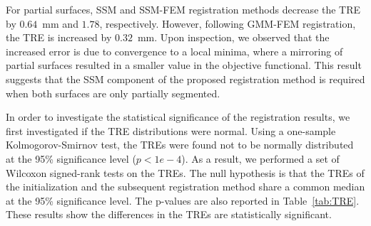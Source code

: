 \documentclass[journal]{IEEEtran}
\begin{document}
For partial surfaces, SSM and SSM-FEM registration methods decrease the TRE by $0.64$~mm and $1.78$, respectively. However, following GMM-FEM registration, the TRE is increased by $0.32$~mm. Upon inspection, we observed that the increased error is due to convergence to a local minima, where a mirroring of partial surfaces resulted in a smaller value in the objective functional. This result suggests that the SSM component of the proposed registration method is required when both surfaces are only partially segmented.

In order to investigate the statistical significance of the registration results, we first investigated if the TRE distributions were normal. Using a one-sample Kolmogorov-Smirnov test, the TREs were found not to be normally distributed at the 95\% significance level ($p<1e-4$). As a result, we performed a set of Wilcoxon signed-rank tests on the TREs. The null hypothesis is that the TREs of the initialization and the subsequent registration method share a common median at the 95\% significance level. The p-values are also reported in Table~\ref{tab:TRE}. These results show the differences in the TREs are statistically significant. 
\end{document}

